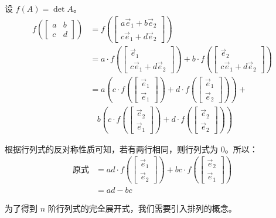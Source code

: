 \begin{solve}
	设 $f(A) = \det A$。
	$$
	\begin{aligned}
		f(\begin{bmatrix}a&b\\c&d\end{bmatrix}) &= f(\begin{bmatrix}a\vec e_1 + b\vec e_2\\c\vec e_1 + d\vec e_2\end{bmatrix})
		\\&= a \cdot f(\begin{bmatrix}\vec e_1\\c\vec e_1 + d\vec e_2\end{bmatrix}) + b \cdot f(\begin{bmatrix}\vec e_2\\c\vec e_1 + d\vec e_2\end{bmatrix})
		\\&= a\left(c \cdot f(\begin{bmatrix}\vec e_1\\\vec e_1\end{bmatrix}) +
		d \cdot f(\begin{bmatrix}\vec e_1\\\vec e_2\end{bmatrix})\right) +
		\\&~~~~
		b\left(c \cdot f(\begin{bmatrix}\vec e_2\\\vec e_1\end{bmatrix}) +
		d \cdot f(\begin{bmatrix}\vec e_2\\\vec e_2\end{bmatrix})\right)
	\end{aligned}
	$$

	根据行列式的反对称性质可知，若有两行相同，则行列式为 $0$。所以：
	$$
	\begin{aligned}
		\text{原式} &= ad \cdot f(\begin{bmatrix}\vec e_1\\\vec e_2\end{bmatrix}) + bc \cdot f(\begin{bmatrix}\vec e_2\\\vec e_1\end{bmatrix})
		\\&=
		ad - bc
	\end{aligned}
	$$
\end{solve}

为了得到 $n$ 阶行列式的完全展开式，我们需要引入排列的概念。

